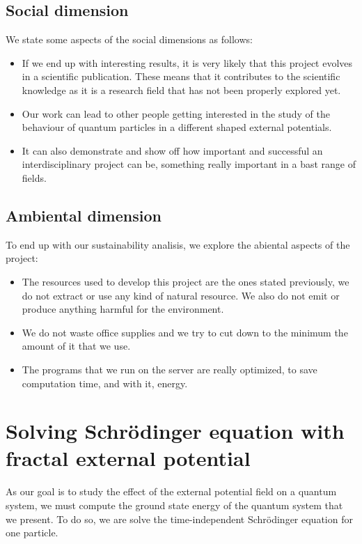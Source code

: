 \documentclass{article}
\begin{document}
\subsection{Social dimension}
We state some aspects of the social dimensions as follows: 
\begin{itemize}
    \item If we end up with interesting results, it is very likely that this project evolves in a scientific publication. These means that it contributes to the scientific knowledge as it is a research field that has not been properly explored yet.
    \item Our work can lead to other people getting interested in the study of the behaviour of quantum particles in a different shaped external potentials.
    \item It can also demonstrate and show off how important and successful an interdisciplinary project can be, something really important in a bast range of fields.
    
\end{itemize}


\subsection{Ambiental dimension}
To end up with our sustainability analisis, we explore the abiental aspects of the project:
\begin{itemize}
    \item The resources used to develop this project are the ones stated previously, we do not extract or use any kind of natural resource. We also do not emit or produce anything harmful for the environment.
    \item We do not waste office supplies and we try to cut down to the minimum the amount of it that we use.
    \item The programs that we run on the server are really optimized, to save computation time, and with it, energy. 
\end{itemize}

\break
\section{Solving Schrödinger equation with fractal external potential}

As our goal is to study the effect of the external potential field on a 
quantum system, we must compute the ground state energy of the quantum system 
that we present. To do so, we are solve the time-independent Schrödinger equation 
for one particle.
\end{document}
